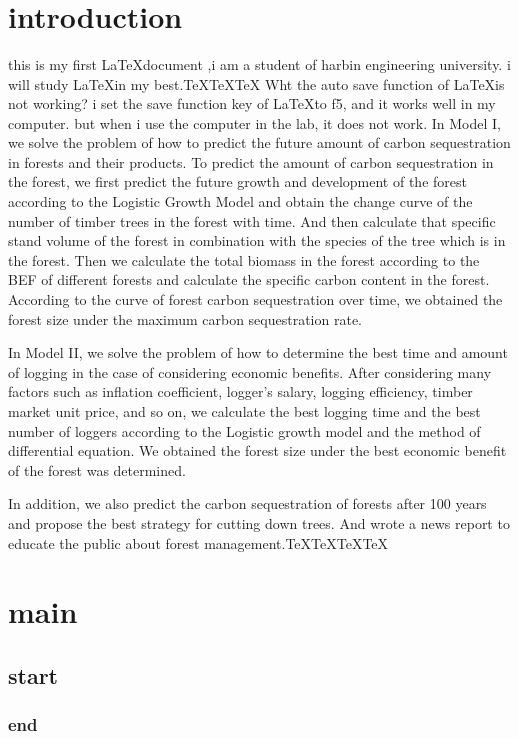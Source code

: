 \documentclass{article}
\begin{document}
~\\~\\~\\

\tableofcontents
\section{introduction}
this is my first \LaTeX document ,i am a student of harbin engineering university.
i will study \LaTeX in my best.\TeX\TeX\TeX
Wht the auto save function of \LaTeX is not working?
i set the save function key of \LaTeX to f5, and it works well in my computer.
but when i use the computer in the lab, it does not work.
In Model I, we solve the problem of how to predict the future amount of carbon
sequestration in forests and their products. To predict the amount of carbon
sequestration in the forest, we first predict the future growth and development
of the forest according to the Logistic Growth Model and obtain the change
curve of the number of timber trees in the forest with time. And then calculate
that specific stand volume of the forest in combination with the species of the
tree which is in the forest. Then we calculate the total biomass in the forest
according to the BEF of different forests and calculate the specific carbon
content in the forest. According to the curve of forest carbon sequestration
over time, we obtained the forest size under the maximum carbon sequestration
rate.

In Model II, we solve the problem of how to determine the best time and amount
of logging in the case of considering economic benefits. After considering many
factors such as inflation coefficient, logger's salary, logging efficiency,
timber market unit price, and so on, we calculate the best logging time and the
best number of loggers according to the Logistic growth model and the method of
differential equation. We obtained the forest size under the best economic
benefit of the forest was determined.

In addition, we also predict the carbon sequestration of forests after 100
years and propose the best strategy for cutting down trees. And wrote a news
report to educate the public about forest management.\TeX\TeX\TeX\TeX
\newpage
\section{main}
\subsection{start}
\subsubsection{end}
\end{document}
